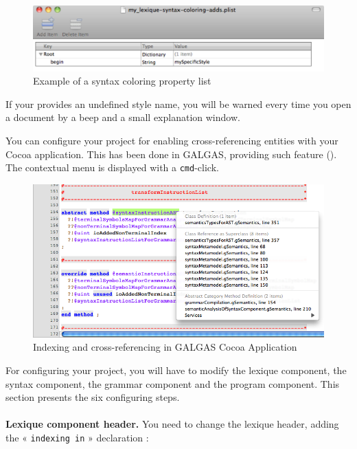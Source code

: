 \begin{figure}[ht]
  \centering
  \includegraphics[width=15cm]{chapter-cocoa-features/custom-syntax-coloring-property-list-edition.pdf}
  \caption{Example of a syntax coloring property list}
\end{figure}

If your provides an undefined style name, you will be warned every time you open a document by a beep and a small explanation window.







You can configure your project for enabling cross-referencing entities with your Cocoa application. This has been done in GALGAS, providing such feature (). The contextual menu is displayed with a \texttt{cmd}-click.

\begin{figure}[ht]
  \centering
  \includegraphics[width=16cm]{chapter-cocoa-features/indexing-sample.png}
  \caption{Indexing and cross-referencing in GALGAS Cocoa Application}
\end{figure}

For configuring your project, you will have to modify the lexique component, the syntax component, the grammar component and the program component. This section presents the six configuring steps.
 \\
 \\
 \textbf{Lexique component header.} You need to change the lexique header, adding the « \texttt{indexing in} » declaration :


